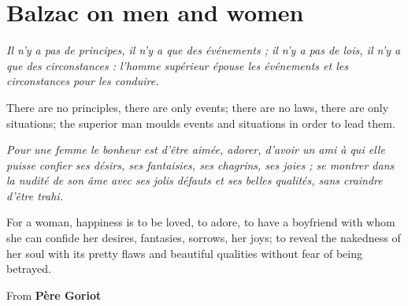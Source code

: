 \section{Balzac on men and women}

\begin{quotationx}
\textit{Il n'y a pas de principes, il n'y a que des événements ; il n'y a pas de lois, il n'y a que des circonstances : l'homme supérieur épouse les événements et les circonstances pour les conduire.}

There are no principles, there are only events; there are no laws, there are only situations; the superior man moulds events and situations in order to lead them.
\end{quotationx}


\begin{quotationx}
\textit{Pour une femme le bonheur est d'être aimée, adorer, d'avoir un ami à qui elle puisse confier ses désirs, ses fantaisies, ses chagrins, ses joies ; se montrer dans la nudité de son âme avec ses jolis défauts et ses belles qualités, sans craindre d'être trahi.}

For a woman, happiness is to be loved, to adore, to have a boyfriend with whom she can confide her desires, fantasies, sorrows, her joys; to reveal the nakedness of her soul with its pretty flaws and beautiful qualities without fear of being betrayed.
\end{quotationx}


From \textbf{Père Goriot}



